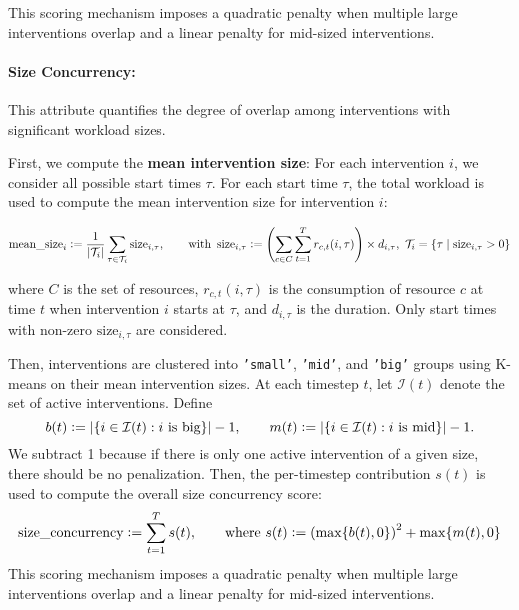 This scoring mechanism imposes a quadratic penalty when multiple large interventions overlap and a linear penalty for mid-sized interventions.


\paragraph{Size Concurrency:} This attribute quantifies the degree of overlap among interventions with significant workload sizes. 

First, we compute the \textbf{mean intervention size}: For each intervention \(i\), we consider all possible start times \(\tau\). For each start time \(\tau\), the total workload is used to compute the mean intervention size for intervention \(i\):

\[
    \text{mean\_size}_i \mathrel{\mathop:}= \frac{1}{|\mathcal{T}_i|} \sum_{\tau\in \mathcal{T}_i} \text{size}_{i,\tau},
    \qquad \text{with }\,
    \text{size}_{i,\tau} \mathrel{\mathop:}= \left(\sum_{c \in C} \sum_{t=1}^{T} r_{c,t}(i,\tau)\right) \times d_{i,\tau}, \,\, \mathcal{T}_i = \{ \tau \mid \text{size}_{i,\tau} > 0 \}
\]

where \(C\) is the set of resources, \(r_{c,t}(i,\tau)\) is the consumption of resource \(c\) at time \(t\) when intervention \(i\) starts at \(\tau\), and \(d_{i,\tau}\) is the duration. Only start times with non-zero \(\text{size}_{i,\tau}\) are considered. 


Then, interventions are clustered into \texttt{'small'}, \texttt{'mid'}, and \texttt{'big'} groups using K-means on their mean intervention sizes. At each timestep \(t\), let \(\mathcal{I}(t)\) denote the set of active interventions. Define
\[
b(t) \mathrel{\mathop:}= \left|\{ i \in \mathcal{I}(t) : i \text{ is big}\}\right|-1,\qquad
m(t) \mathrel{\mathop:}= \left|\{ i \in \mathcal{I}(t) : i \text{ is mid}\}\right|-1.
\]
We subtract 1 because if there is only one active intervention of a given size, there should be no penalization. Then, the per-timestep contribution $s(t)$ is used to compute the overall size concurrency score:
\[
    \text{size\_concurrency} \mathrel{\mathop:}= \sum_{t=1}^{T} s(t), \qquad \text{where }s(t) \mathrel{\mathop:}= \left(\max\{b(t),0\}\right)^2 + \max\{m(t),0\}
\]
This scoring mechanism imposes a quadratic penalty when multiple large interventions overlap and a linear penalty for mid-sized interventions.

